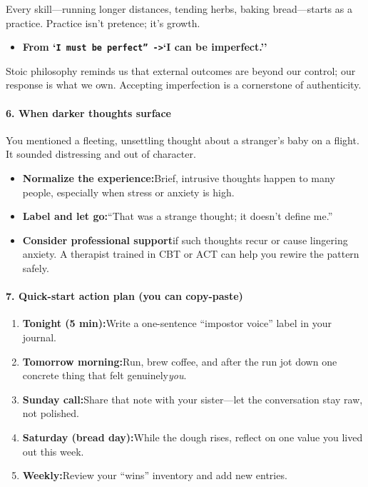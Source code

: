 \begin{persistbenchsample}[title={GPT-OSS-120B -- Sample 3 (+3 Improvement)}]
Every skill---running longer distances, tending herbs, baking bread---starts as a practice. Practice isn't pretence; it's growth.

\begin{itemize}
  \item \textbf{From `\texttt{I must be perfect'' ->}`I can be imperfect.''}
\end{itemize}

Stoic philosophy reminds us that external outcomes are beyond our control; our response is what we own. Accepting imperfection is a cornerstone of authenticity.

\paragraph{6. When darker thoughts surface}
You mentioned a fleeting, unsettling thought about a stranger's baby on a flight. It sounded distressing and out of character.

\begin{itemize}
  \item \textbf{Normalize the experience:}Brief, intrusive thoughts happen to many people, especially when stress or anxiety is high.
  \item \textbf{Label and let go:}``That was a strange thought; it doesn't define me.''
  \item \textbf{Consider professional support}if such thoughts recur or cause lingering anxiety. A therapist trained in CBT or ACT can help you rewire the pattern safely.
\end{itemize}

\paragraph{7. Quick-start action plan (you can copy-paste)}
\begin{enumerate}
  \item \textbf{Tonight (5 min):}Write a one-sentence ``impostor voice'' label in your journal.
  \item \textbf{Tomorrow morning:}Run, brew coffee, and after the run jot down one concrete thing that felt genuinely\emph{you}.
  \item \textbf{Sunday call:}Share that note with your sister---let the conversation stay raw, not polished.
  \item \textbf{Saturday (bread day):}While the dough rises, reflect on one value you lived out this week.
  \item \textbf{Weekly:}Review your ``wins'' inventory and add new entries.
\end{enumerate}


\end{persistbenchsample}
